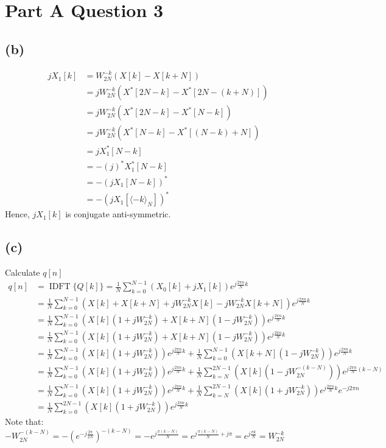 \documentclass{article}
\DeclareMathOperator{\IDFT}{IDFT}
\newenvironment{homeworkProblem}[1]{
	\section*{#1}
	}{
}
\newenvironment{homeworkSection}[1]{
	\subsection*{#1}
	}{
}
\begin{document}
\begin{homeworkProblem}{Part A Question 3}
\begin{homeworkSection}{(b)}
\begin{align*}
j X_1[k] &= W_{2N}^{-k} (X[k] - X[k+N])\\
&= j W_{2N}^{-k} (X^*[2N-k] - X^*[2N-(k+N)])\\
&= j W_{2N}^{-k} (X^*[2N-k] - X^*[N-k])\\
&= j W_{2N}^{-k} (X^*[N-k] - X^*[(N-k)+N])\\
&= j X_1^*[N-k]\\
&= - (j)^* X_1^*[N-k]\\
&= - (j X_1[N-k])^*\\
&= - (j X_1[\langle-k\rangle_N])^*
\end{align*}
Hence, $jX_1[k]$ is conjugate anti-symmetric.

\end{homeworkSection}


\begin{homeworkSection}{(c)}

Calculate $q[n]$
\begin{align*}
q[n] &= \IDFT\{Q[k]\} = \frac{1}{N} \sum_{k=0}^{N-1} (X_0[k] + j X_1[k]) e^{j \frac{2 \pi n}{N} k}\\
&= \frac{1}{N} \sum_{k=0}^{N-1} \left(X[k] + X[k+N] + j W_{2N}^{-k} X[k] - j W_{2N}^{-k} X[k+N]\right) e^{j \frac{2 \pi n}{N} k}\\
&= \frac{1}{N} \sum_{k=0}^{N-1} \left(X[k] (1 + j W_{2N}^{-k}) + X[k+N] (1 - j W_{2N}^{-k})\right) e^{j \frac{2 \pi n}{N} k}\\
&= \frac{1}{N} \sum_{k=0}^{N-1} \left(X[k] (1 + j W_{2N}^{-k}) + X[k+N] (1 - j W_{2N}^{-k})\right) e^{j \frac{2 \pi n}{N} k}\\
&= \frac{1}{N} \sum_{k=0}^{N-1} \left(X[k] (1 + j W_{2N}^{-k})\right) e^{j \frac{2 \pi n}{N} k} + \frac{1}{N} \sum_{k=0}^{N-1} \left(X[k+N] (1 - j W_{2N}^{-k})\right) e^{j \frac{2 \pi n}{N} k}\\
&= \frac{1}{N} \sum_{k=0}^{N-1} \left(X[k] (1 + j W_{2N}^{-k})\right) e^{j \frac{2 \pi n}{N} k} + \frac{1}{N} \sum_{k=N}^{2N-1} \left(X[k] (1 - j W_{2N}^{-(k-N)})\right) e^{j \frac{2 \pi n}{N} (k-N)}\\
&= \frac{1}{N} \sum_{k=0}^{N-1} \left(X[k] (1 + j W_{2N}^{-k})\right) e^{j \frac{2 \pi n}{N} k} + \frac{1}{N} \sum_{k=N}^{2N-1} \left(X[k] (1 + j W_{2N}^{-k})\right) e^{j \frac{2 \pi n}{N} k} e^{- j 2\pi n}\\
&= \frac{1}{N} \sum_{k=0}^{2N-1} \left(X[k] (1 + j W_{2N}^{-k})\right) e^{j \frac{2 \pi n}{N} k}
\end{align*}
Note that: $- W_{2N}^{-(k-N)} = - (e^{-j \frac{2\pi}{2N}})^{-(k-N)} = - e^{j \frac{\pi (k-N)}{N}} = e^{j \frac{\pi (k-N)}{N} + j\pi} = e^{j \frac{\pi k}{N}} = W_{2N}^{-k}$\\


\end{homeworkSection}
\end{homeworkProblem}
\end{document}
